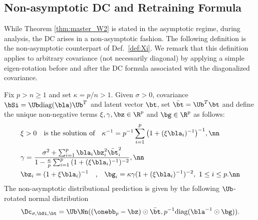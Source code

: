 \subsection{Non-asymptotic DC and Retraining Formula}
While Theorem \ref{thm:master_W2} is stated in the asymptotic regime, during analysis, the DC arises in a non-asymptotic fashion. The following definition is the non-asymptotic counterpart of Def.~\ref{def:Xi}. We remark that this definition applies to arbitrary covariance (not necessarily diagonal) by applying a simple eigen-rotation before and after the DC formula associated with the diagonalized covariance.
\begin{definition} \label{aux_def}Fix $p>n\geq 1$ and set $\kappa=p/n>1$. Given $\sigma>0$, covariance $\bSi=\Ub\text{diag}(\bla)\Ub^T$ and latent vector $\bt$, set $\bar{\bt}=\Ub^T\bt$ and define the unique non-negative terms $\xi,\gamma,\bz\in\R^p$ and $\bg\in\R^p$ as follows:\vspace{-0pt}
\begin{align}
&\xi>0\quad\text{is the solution of}\quad \kappa^{-1}={p^{-1}}\sum_{i=1}^p\big({1+(\xi\bla_i)^{-1}}\big)^{-1},\nn\\
&\gamma=\frac{\sigma^2+\sum_{i=1}^p\bla_i\bz_i^2\bar{\bt}_i^2}{1-\frac{\kappa}{p}\sum_{i=1}^p{(1+(\xi\bla_i)^{-1})^{-2}}},\nn\\
&\bz_i=({1+\xi\bla_i})^{-1}\quad\text{,}\quad \bg_i={\kappa\gamma}(1+(\xi\bla_i)^{-1})^{-2},~ 1\leq i\leq p.\nn
\end{align}
The non-asymptotic distributional prediction is given by the following $\Ub$-rotated normal distribution
\[
\Dc_{\sigma,\bSi,\bt}=\Ub\Nn((\onebb_p-\bz)\odot\bar{\bt},p^{-1}\text{diag}(\bla^{-1}\odot\bg)).
\]
\end{definition}
